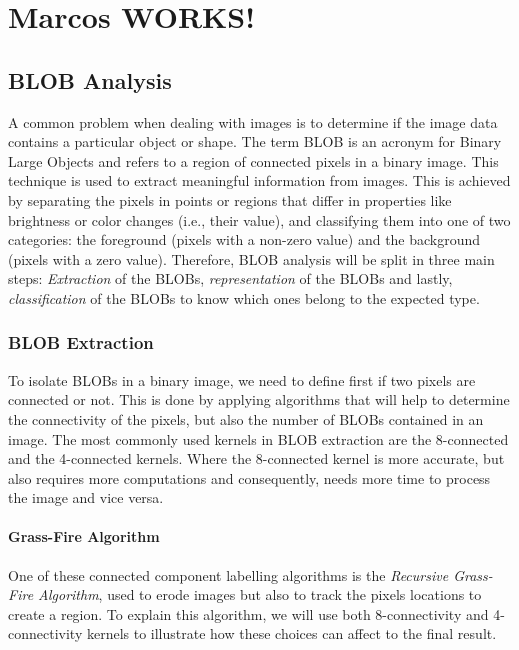 \chapter{Marcos WORKS!}

\section{BLOB Analysis}
A common problem when dealing with images is to determine if the image data contains a particular object or shape. The term BLOB is an acronym for Binary Large Objects and refers to a region of connected pixels in a binary image. This technique is used to extract meaningful information from images. This is achieved by separating the pixels in points or regions that differ in properties like brightness or color changes (i.e., their value), and classifying them into one of two categories: the foreground (pixels with a non-zero value) and the background (pixels with a zero value).
Therefore, BLOB analysis will be split in three main steps: \textit{Extraction} of the BLOBs, \textit{representation} of the BLOBs and lastly, \textit{classification} of the BLOBs to know which ones belong to the expected type.
\subsection{BLOB Extraction}
To isolate BLOBs in a binary image, we need to define first if two pixels are connected or not. This is done by applying algorithms that will help to determine the connectivity of the pixels, but also the number of BLOBs contained in an image. The most commonly used kernels in BLOB extraction are the 8-connected and the 4-connected kernels. Where the 8-connected kernel is more accurate, but also requires more computations and consequently, needs more time to process the image and vice versa.


\subsubsection{Grass-Fire Algorithm}
One of these connected component labelling algorithms is the \textit{Recursive Grass-Fire Algorithm}, used to erode images but also to track the pixels locations to create a region.
To explain this algorithm, we will use both 8-connectivity and 4-connectivity kernels to illustrate how these choices can affect to the final result.

